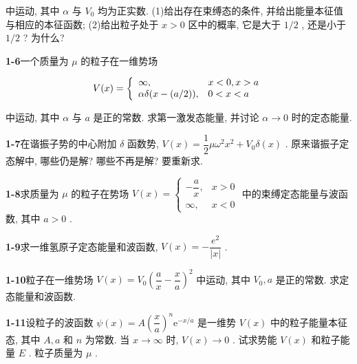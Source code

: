 中运动, 其中 $\displaystyle \alpha$ 与 $\displaystyle V_{0}$ 均为正实数. (1)给出存在束缚态的条件, 并给出能量本征值与相应的本征函数; (2)给出粒子处于 $\displaystyle x > 0$ 区中的概率, 它是大于 $\displaystyle 1/2$ , 还是小于 $\displaystyle 1/2$ ? 为什么?

\vfill

\newpage

\textbf{1-6}\quad 一个质量为 $\displaystyle \mu$ 的粒子在一维势场

$$
V (x) = \left\{ \begin{array}{l l} \infty , & x <   0, x > a \\ \alpha \delta (x - (a / 2)), & 0 <   x <   a \end{array} \right.
$$

中运动, 其中 $\displaystyle \alpha$ 与 $\displaystyle a$ 是正的常数. 求第一激发态能量, 并讨论 $\displaystyle \alpha \to 0$ 时的定态能量.

\vfill

\newpage

\textbf{1-7}\quad 在谐振子势的中心附加 $\displaystyle \delta$ 函数势, $\displaystyle V(x) = \dfrac{1}{2} \mu \omega^2 x^2 + V_0 \delta(x)$ . 原来谐振子定态解中, 哪些仍是解? 哪些不再是解? 要重新求.

\vfill

\newpage

\textbf{1-8}\quad 求质量为 $\displaystyle \mu$ 的粒子在势场 $\displaystyle V(x) = \begin{cases} -\dfrac{a}{x}, & x > 0 \\ \infty, & x < 0 \end{cases}$ 中的束缚定态能量与波函数, 其中 $\displaystyle a > 0$ .

\vfill

\newpage

\textbf{1-9}\quad 求一维氢原子定态能量和波函数, $\displaystyle V(x) = -\dfrac{e^2}{|x|}$ .

\vfill

\newpage

\textbf{1-10}\quad 粒子在一维势场 $\displaystyle V(x) = V_{0}\left(\dfrac{a}{x} -\dfrac{x}{a}\right)^{2}$ 中运动, 其中 $\displaystyle V_{0}, a$ 是正的常数. 求定态能量和波函数.

\vfill

\newpage

\textbf{1-11}\quad 设粒子的波函数 $\displaystyle \psi(x) = A\left(\dfrac{x}{a}\right)^n\mathrm{e}^{-x / a}$ 是一维势 $\displaystyle V(x)$ 中的粒子能量本征态, 其中 $\displaystyle A, a$ 和 $\displaystyle n$ 为常数. 当 $\displaystyle x \to \infty$ 时, $\displaystyle V(x) \to 0$ . 试求势能 $\displaystyle V(x)$ 和粒子能量 $\displaystyle E$ . 粒子质量为 $\displaystyle \mu$ .

